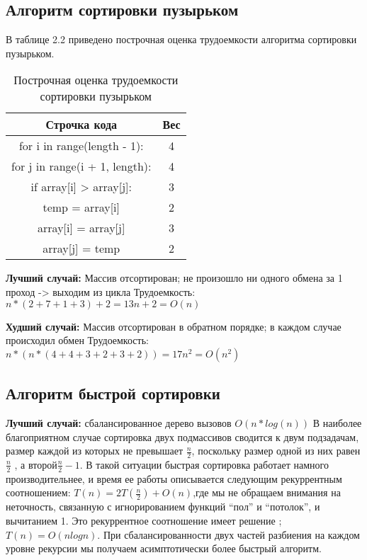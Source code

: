 \subsection{Алгоритм сортировки пузырьком}

В таблице 2.2 приведено построчная оценка трудоемкости алгоритма сортировки пузырьком.
\begin{table}[h!]
	\centering
	\caption{Построчная оценка трудоемкости сортировки пузырьком}
	\begin{tabular}{|c c|} 
		\hline
		Строчка кода & Вес \\ [0.5ex] 
		\hline
		for i in range(length - 1): & 4 \\
		\hline
		for j in range(i + 1, length): & 4 \\
		\hline
		if array[i] > array[j]: & 3 \\
		\hline
		temp = array[i] & 2 \\
		\hline
		array[i] = array[j] & 3 \\
		\hline
		array[j] = temp & 2 \\
		\hline
	\end{tabular}
\end{table}


\textbf{Лучший случай:} Массив отсортирован; не произошло ни одного обмена за 1 проход -> выходим из цикла \newline
Трудоемкость:  $n* (2 + 7 + 1 + 3 ) + 2 = 13n + 2 = O(n)$

\textbf{Худший случай:}  Массив отсортирован в обратном порядке; в каждом случае происходил обмен\newline
Трудоемкость: $n*(n* (4 + 4 + 3 + 2 + 3 + 2)) =  17n^2 = O(n^2)$



\subsection{Алгоритм быстрой сортировки}

\textbf{Лучший случай:} сбалансированное дерево вызовов \(O(n*log(n))\)  
В наиболее благоприятном случае сортировка двух подмассивов сводится к двум подзадачам, размер каждой из которых не превышает $\frac{n}{2}$, поскольку размер одной из них равен $\frac{n}{2}$ , а второй$\frac{n}{2} - 1$. В такой ситуации быстрая сортировка работает намного производительнее, и время ее работы описывается следующим рекуррентным соотношением: $T(n) = 2T(\frac{n}{2}) + O(n)$,где мы не обращаем внимания на неточность, связанную с игнорированием функций “пол” и “потолок”, и вычитанием 1. Это рекуррентное соотношение имеет решение ; $T(n) = O(nlogn)$. При сбалансированности двух частей разбиения на каждом уровне рекурсии мы получаем асимптотически более быстрый алгоритм.

